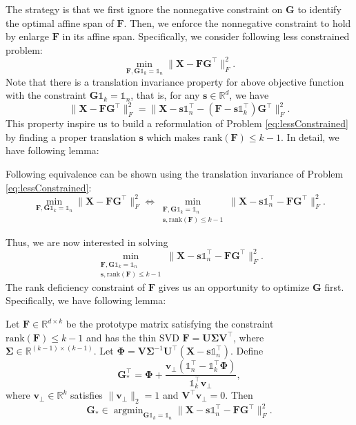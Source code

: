 \documentclass[journal]{IEEEtran}
\begin{document}
The strategy is that we first ignore the nonnegative constraint on $\mathbf{G}$ to 
identify the optimal affine span of $\mathbf{F}$.
Then, we enforce the nonnegative constraint to hold by enlarge $\mathbf{F}$ in its affine span.
Specifically, we consider following less constrained problem:
\begin{equation}\label{eq:lessConstrained}
\min_{\mathbf{F},\mathbf{G}\mathbb{1}_k = \mathbb{1}_n} \| \mathbf{X} - \mathbf{FG}^\top\|_F^2.
\end{equation}
Note that there is a translation invariance property for above objective function with the constraint $\mathbf{G}\mathbb{1}_k=\mathbb{1}_n$, that is, for any $\mathbf{s} \in \mathbb{R}^d$, we have
\[
\|\mathbf{X} - \mathbf{F}\mathbf{G}^\top\|_F^2 = \|\mathbf{X} - \mathbf{s}\mathbb{1}_n^\top - (\mathbf{F}-\mathbf{s}\mathbb{1}_k^\top)\mathbf{G}^\top\|_F^2.
\]
This property inspire us to build a reformulation of Problem \eqref{eq:lessConstrained} by finding a proper translation $\mathbf{s}$ which makes $\text{rank}(\mathbf{F}) \leq k-1$. 
In detail, we have following lemma:
\begin{Lemma1}\label{eq:transLemma}
	Following equivalence can be shown using the translation invariance of Problem \eqref{eq:lessConstrained}:
	\[
	\min_{\mathbf{F},\mathbf{G}\mathbb{1}_k = \mathbb{1}_n} \| \mathbf{X} - \mathbf{FG}^\top\|_F^2
	\Leftrightarrow
	\min_{\substack{\mathbf{F},\mathbf{G}\mathbb{1}_k = \mathbb{1}_n \\ \mathbf{s}, \text{rank}(\mathbf{F}) \leq k-1 }} \| \mathbf{X} - \mathbf{s}\mathbb{1}_n^\top- \mathbf{FG}^\top\|_F^2.
	\]
\end{Lemma1}
Thus, we are now interested in solving
\begin{equation}\label{eq:rankProblem}
\min_{\substack{\mathbf{F},\mathbf{G}\mathbb{1}_k = \mathbb{1}_n \\ \mathbf{s}, \text{rank}(\mathbf{F}) \leq k-1 }} \| \mathbf{X} - \mathbf{s}\mathbb{1}_n^\top- \mathbf{FG}^\top\|_F^2.
\end{equation}
The rank deficiency constraint of $\mathbf{F}$ gives us an opportunity to optimize $\mathbf{G}$ first. Specifically, we have following lemma:
\begin{Lemma1}\label{lem:optimizedG}
	Let $\mathbf{F}\in\mathbb{R}^{d\times k}$ be the prototype matrix satisfying the constraint $\text{rank}(\mathbf{F}) \leq k-1$ and has the thin SVD $\mathbf{F}=\mathbf{U}\mathbf{\Sigma}\mathbf{V}^\top$, where $\mathbf{\Sigma}\in\mathbb{R}^{(k-1)\times(k-1)}$. Let $ \mathbf{\Phi} = \mathbf{V}\mathbf{\Sigma}^{-1}\mathbf{U}^\top \left(\mathbf{X}-\mathbf{s}\mathbb{1}_n^\top\right)$. Define
	\[
	\mathbf{G}_*^\top = \mathbf{\Phi} 
	+
	\frac{\mathbf{v}_\bot\left(\mathbb{1}_n^\top - \mathbb{1}_k^\top \mathbf{\Phi} \right) }{\mathbb{1}_k^\top\mathbf{v}_\bot },
	\]
	where $\mathbf{v}_\bot \in \mathbb{R}^k$ satisfies $\|\mathbf{v}_\bot\|_2 = 1$ and $\mathbf{V}^\top \mathbf{v}_\bot = 0$.
	Then
	\[
	\mathbf{G}_* \in \mathop{\arg\min}_{\mathbf{G}\mathbb{1}_k = \mathbb{1}_n} \| \mathbf{X} - \mathbf{s}\mathbb{1}_n^\top- \mathbf{FG}^\top\|_F^2.
	\]
\end{Lemma1}
\end{document}
